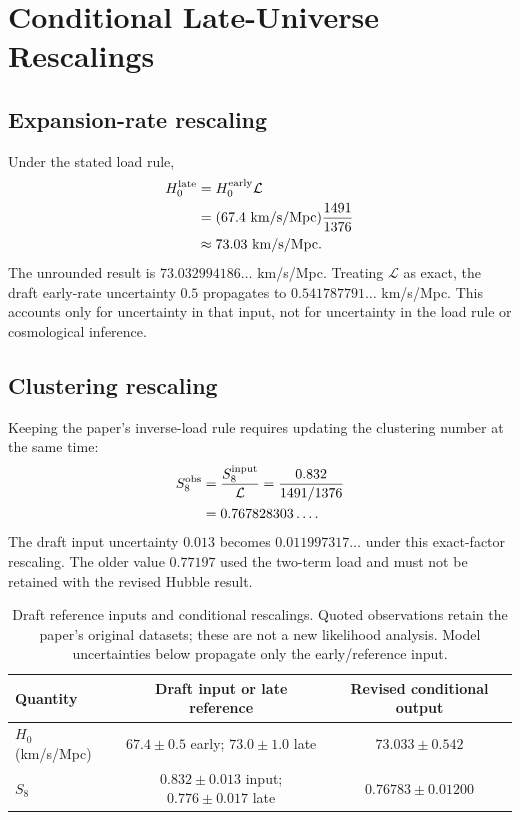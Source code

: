\section{Conditional Late-Universe Rescalings}

\subsection{Expansion-rate rescaling}
Under the stated load rule,
\begin{equation}
\begin{split}
H_0^{\rm late}&=H_0^{\rm early}\mathcal L\\
&=(67.4\ \mathrm{km/s/Mpc})\frac{1491}{1376}\\
&\approx73.03\ \mathrm{km/s/Mpc}.
\end{split}
\end{equation}
The unrounded result is $73.032994186\ldots$ km/s/Mpc. Treating $\mathcal L$ as exact, the draft early-rate uncertainty $0.5$ propagates to $0.541787791\ldots$ km/s/Mpc. This accounts only for uncertainty in that input, not for uncertainty in the load rule or cosmological inference.

\subsection{Clustering rescaling}
Keeping the paper's inverse-load rule requires updating the clustering number at the same time:
\begin{equation}
\begin{split}
S_8^{\rm obs}&=\frac{S_8^{\rm input}}{\mathcal L}
=\frac{0.832}{1491/1376}\\
&=0.767828303\ldots.
\end{split}
\end{equation}
The draft input uncertainty $0.013$ becomes $0.011997317\ldots$ under this exact-factor rescaling. The older value $0.77197$ used the two-term load and must not be retained with the revised Hubble result.

\begin{table}[t]
\centering
\caption{Draft reference inputs and conditional rescalings. Quoted observations retain the paper's original datasets; these are not a new likelihood analysis. Model uncertainties below propagate only the early/reference input.}
\begin{tabular}{lcc}
\hline
Quantity & Draft input or late reference & Revised conditional output\\
\hline
$H_0$ (km/s/Mpc) & $67.4\pm0.5$ early; $73.0\pm1.0$ late & $73.033\pm0.542$\\
$S_8$ & $0.832\pm0.013$ input; $0.776\pm0.017$ late & $0.76783\pm0.01200$\\
\hline
\end{tabular}
\end{table}

